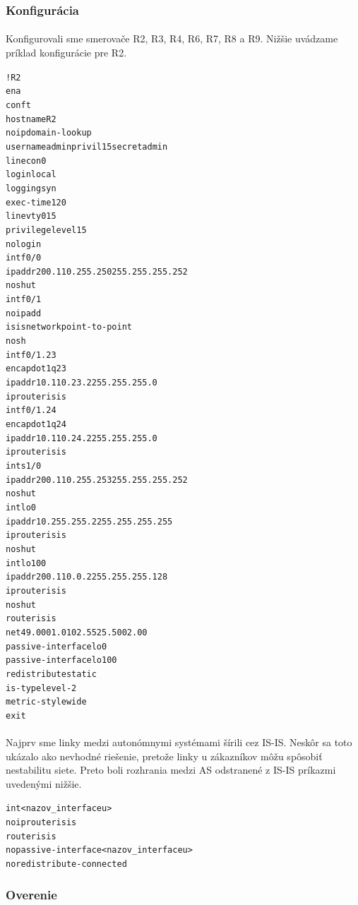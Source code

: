 \documentclass[12pt,twoside,a4paper]{report}
\begin{document}
\subsubsection{Konfigurácia}
\paragraph{}
Konfigurovali sme smerovače R2, R3, R4, R6, R7, R8 a R9. Nižšie uvádzame príklad konfigurácie pre R2.

\noindent
{\selectfont
\begin{small}
\begin{alltt}
!R2
ena
conf t
hostname R2
no ip domain-lookup
username admin privil 15 secret admin
line con 0
  login local
  logging syn
  exec-time 120
line vty 0 15
  privilege level 15
  no login
int f0/0
  ip addr 200.110.255.250 255.255.255.252
  no shut
int f0/1
  no ip add
  isis network point-to-point
  no sh
int f0/1.23
  encap dot1q 23
  ip addr 10.110.23.2 255.255.255.0
  ip router isis
int f0/1.24
  encap dot1q 24
  ip addr 10.110.24.2 255.255.255.0
  ip router isis
int s1/0
  ip addr 200.110.255.253 255.255.255.252
  no shut
int lo0
  ip addr 10.255.255.2 255.255.255.255
  ip router isis
  no shut
int lo100
  ip addr 200.110.0.2 255.255.255.128
  ip router isis
  no shut
router isis
  net 49.0001.0102.5525.5002.00
  passive-interface lo0
  passive-interface lo100
  redistribute static
  is-type level-2
  metric-style wide
  exit
\end{alltt}
\end{small}
}

\paragraph{}
Najprv sme linky medzi autonómnymi systémami šírili cez IS-IS. Neskôr sa toto ukázalo ako nevhodné riešenie, pretože  linky u zákazníkov môžu spôsobiť nestabilitu siete. Preto boli rozhrania medzi AS odstranené z IS-IS príkazmi uvedenými nižšie.

\noindent
{\selectfont
\begin{small}
\begin{alltt}
int <nazov_interfaceu>
  no ip router isis
router isis
  no passive-interface <nazov_interfaceu>
  no redistribute-connected
\end{alltt}
\end{small}
}


\subsubsection{Overenie}
\end{document}
